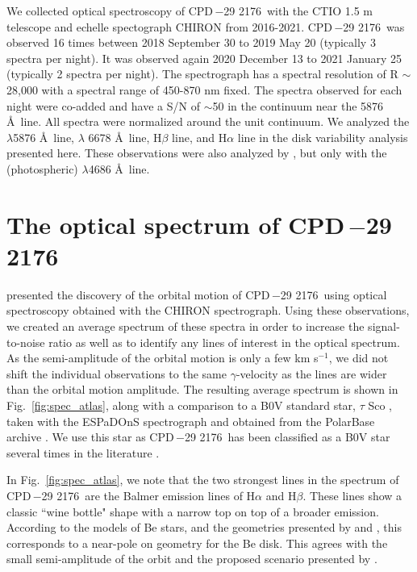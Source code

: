 \documentclass[]{aastex631}
\newcommand{\target}{CPD\,$-$29 2176}
\begin{document}
We collected optical spectroscopy of \target\ with the CTIO 1.5 m telescope and echelle spectograph CHIRON from 2016-2021. \target\ was observed 16 times between 2018 September 30 to 2019 May 20 (typically 3 spectra per night). It was observed again 2020 December 13 to 2021 January 25 (typically 2 spectra per night). The spectrograph has a spectral resolution of R $\sim$ 28,000 with a spectral range of 450-870 nm fixed. The spectra observed for each night were co-added and have a S/N of $\sim$50 in the continuum near the  5876 \AA\ line. All spectra were normalized around the unit continuum. We analyzed the  $\lambda$5876 \AA\ line,  $\lambda$ 6678 \AA\ line, H$\beta$ line, and H$\alpha$ line in the disk variability analysis presented here. These observations were also analyzed by \citet{noel}, but only with the (photospheric)  $\lambda$4686 \AA\ line.

\section{The optical spectrum of \target}

\citet{noel} presented the discovery of the orbital motion of \target\ using optical spectroscopy obtained with the CHIRON spectrograph. Using these observations, we created an average spectrum of these spectra in order to increase the signal-to-noise ratio as well as to identify any lines of interest in the optical spectrum. As the semi-amplitude of the orbital motion is only a few km s$^{-1}$, we did not shift the individual observations to the same $\gamma$-velocity as the lines are wider than the orbital motion amplitude. The resulting average spectrum is shown in Fig.~\ref{fig:spec_atlas}, along with a comparison to a B0V standard star, $\tau$ Sco \citep{1973ARA&A..11...29M}, taken with the ESPaDOnS spectrograph and obtained from the PolarBase archive \citep{1997MNRAS.291..658D, 2014PASP..126..469P}. We use this star as \target\ has been classified as a B0V star several times in the literature \citep{1966AJ.....71..999F, 1983MNRAS.205..241R, 1993ApJS...89..293V}.

In Fig.~\ref{fig:spec_atlas}, we note that the two strongest lines in the spectrum of \target\ are the
Balmer emission lines of H$\alpha$ and H$\beta$. These lines show a classic ``wine bottle" shape with a narrow top on top of a broader emission. According to the models of Be stars, and the geometries presented by \citet{1996A&AS..116..309H} and \citet{Riv2013}, this corresponds to a near-pole on geometry for the Be disk. This agrees with the small semi-amplitude of the orbit and the proposed scenario presented by \citet{noel}. 
\end{document}
